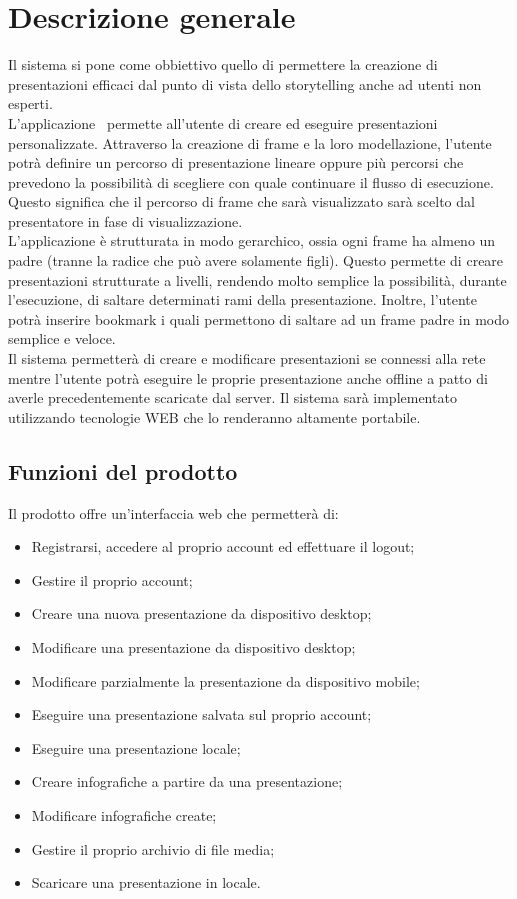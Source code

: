 \section{Descrizione generale}{
Il sistema si pone come obbiettivo quello di permettere la creazione di presentazioni efficaci dal punto di vista dello storytelling anche ad utenti non esperti. \\
L'applicazione \premi\ permette all'utente di creare ed eseguire presentazioni personalizzate. Attraverso la creazione di frame e la loro modellazione, l'utente potrà definire un percorso di presentazione lineare oppure più percorsi che prevedono la possibilità di scegliere con quale continuare il flusso di esecuzione. Questo significa che il percorso di frame che sarà visualizzato sarà scelto dal presentatore in fase di visualizzazione.\\
L'applicazione è strutturata in modo gerarchico, ossia ogni frame ha almeno un padre (tranne la radice che può avere solamente figli). Questo permette di creare presentazioni strutturate a livelli, rendendo molto semplice la possibilità, durante l'esecuzione, di saltare determinati rami della presentazione. Inoltre, l'utente potrà inserire bookmark i quali permettono di saltare ad un frame padre in modo semplice e veloce.\\
Il sistema permetterà di creare e modificare presentazioni se connessi alla rete mentre l'utente potrà eseguire le proprie presentazione anche offline a patto di averle precedentemente scaricate dal server.
Il sistema sarà implementato utilizzando tecnologie WEB che lo renderanno altamente portabile.

\subsection{Funzioni del prodotto}{
	Il prodotto offre un'interfaccia web che permetterà di:
	\begin{itemize}
		\item Registrarsi, accedere al proprio account ed effettuare il logout;
		\item Gestire il proprio account;
		\item Creare una nuova presentazione da dispositivo desktop;
		\item Modificare una presentazione da dispositivo desktop;
		\item Modificare parzialmente la presentazione da dispositivo mobile;
		\item Eseguire una presentazione salvata sul proprio account;
		\item Eseguire una presentazione locale;
		\item Creare infografiche a partire da una presentazione;
		\item Modificare infografiche create;
		\item Gestire il proprio archivio di file media;
		\item Scaricare una presentazione in locale.
	\end{itemize}
}
}
